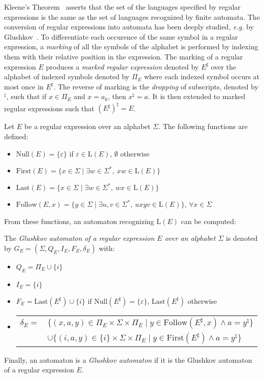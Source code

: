 \documentclass{llncs}
\begin{document}
    Kleene's Theorem~\cite{Kle56} asserts that the set of the languages specified by regular expressions is the same as the set of languages recognized by finite automata.
The conversion of regular expressions into automata has been deeply studied, \emph{e.g.} by Glushkov~\cite{Glu61}.
To differentiate each occurence of the same symbol in a regular expression, 
a \emph{marking} of all the symbols of the alphabet is performed by indexing them with their relative position in the expression. 
The marking of a regular expression $E$ produces a \emph{marked regular expression} denoted by $E^{\sharp}$ over the alphabet of indexed symbols denoted by $\Pi_E$ where each indexed symbol occurs at most once in $E^{\sharp}$.
	The reverse of marking is the \emph{dropping} of subscripts, denoted by $^{\natural}$, such that if $x \in \Pi_E$ and $x = a_k$, then $x^{\natural} = a$.
	It is then extended to marked regular expressions such that $(E^{\sharp})^{\natural} = E$.
	
	Let $E$ be a regular expression over an alphabet $\Sigma$. The following functions are defined:
\begin{itemize}
	\item $\mathrm{Null}(E) = \{\varepsilon\}$ if $\varepsilon \in \mathrm{L}(E)$, $\emptyset$ otherwise
	\item $\mathrm{First}(E) = \{x \in \Sigma \mid \exists w \in \Sigma^*,\ xw \in \mathrm{L}(E)\}$
	\item $\mathrm{Last}(E) = \{x \in \Sigma \mid \exists w \in \Sigma^*,\ wx \in \mathrm{L}(E)\}$
	\item $\mathrm{Follow}(E, x) = \{y \in \Sigma \mid \exists u,v \in \Sigma^*,\ uxyv \in \mathrm{L}(E)\}$, $\forall x \in \Sigma$
\end{itemize}

	From these functions, an automaton recognizing $\mathrm{L}(E)$ can be computed:

\begin{definition}\label{def:Glushkov}
	The \emph{Glushkov automaton of a regular expression $E$ over an alphabet $\Sigma$} is denoted by $G_E = (\Sigma, Q_E, I_E, F_E, \delta_E)$ with:
	\begin{itemize}
		\item $Q_E = \Pi_E \cup \{i\}$
		\item $I_E = \{i\}$
		\item $F_E = \mathrm{Last}(E^{\sharp}) \cup \{i\}$ if $\mathrm{Null}(E^{\sharp}) = \{\varepsilon\}$, $\mathrm{Last}(E^{\sharp})$ otherwise
		\item  
		  \begin{tabular}[t]{l@{\ }l}
		  $\delta_E=$ & $\{(x, a, y) \in \Pi_E \times \Sigma \times \Pi_E \mid y \in \mathrm{Follow}(E^{\sharp}, x) \wedge a = y^{\natural}\}$\\
		  & $  \cup \{(i, a, y) \in \{i\} \times \Sigma \times \Pi_E \mid y \in \mathrm{First}(E^{\sharp}) \wedge a = y^{\natural}\}$
		  \end{tabular}
	\end{itemize}
\end{definition}
Finally, an automaton is a \emph{Glushkov automaton} if it is the Glushkov automaton of a regular expression $E$.
\end{document}
